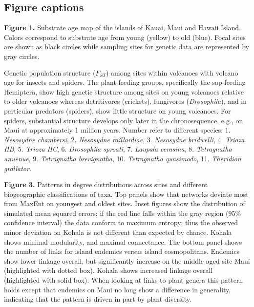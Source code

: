 \documentclass[12pt]{article}
\begin{document}
\begin{linenumbers}
\clearpage

\section*{Figure captions}


{\bf Figure 1.} Substrate age map of the islands of Kauai, Maui and
Hawaii Island. Colors correspond to substrate age from young (yellow)
to old (blue). Focal sites are shown as black circles while sampling
sites for genetic data are represented by gray circles.

\vspace{2em}
 Genetic population structure ($F_{ST}$)
among sites within volcanoes with volcano age for insects and
spiders. The plant-feeding groups, specifically the sap-feeding
Hemiptera, show high genetic structure among sites on young volcanoes
relative to older volcanoes whereas detritivores (crickets),
fungivores ({\it Drosophila}), and in particular predators (spiders),
show little structure on young volcanoes. For spiders, substantial
structure develops only later in the chronosequence, e.g., on Maui at
approximately 1 million years. Number refer to different species:
1. {\it Nesosydne chambersi}, 2. {\it Nesosydne raillardiae}, 3. {\it
  Nesosydne bridwelli}, 4. {\it Trioza HB}, 5. {\it Trioza HC},
6. {\it Drosophila sproati}, 7. {\it Laupala cerasina}, 8. {\it
  Tetragnatha anuenue}, 9. {\it Tetragnatha brevignatha}, 10. {\it
  Tetragnatha quasimodo}, 11. {\it Theridion grallator}.

\vspace{2em}
\noindent
{\bf Figure 3.} Patterns in degree distributions across sites and
different biogeographic classifications of taxa. Top panels show that
networks deviate most from MaxEnt on youngest and oldest sites. Inset
figures show the distribution of simulated mean squared errors; if the
red line falls within the gray region (95\% confidence interval) the
data conform to maximum entropy; thus the observed minor deviation on
Kohala is not different than expected by chance. Kohala shows minimal
modularity, and maximal connectance. The bottom panel shows the number
of links for island endemics versus island cosmopolitans. Endemics
show lower linkage overall, but significantly increase on the middle
aged site Maui (highlighted with dotted box). Kohala shows increased
linkage overall (highlighted with solid box). When looking at links to
plant genera this pattern holds except that endemics on Maui no long
show a difference in generality, indicating that the pattern is driven
in part by plant diversity.


\end{linenumbers}
\end{document}
